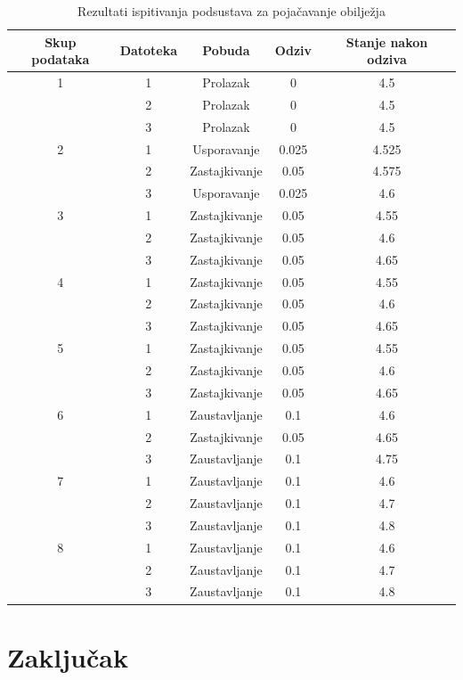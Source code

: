 \documentclass[times, utf8, diplomski, numeric]{fer}
\begin{document}
\begin{table}[H]
	\caption{Rezultati ispitivanja podsustava za pojačavanje obilježja}
	\label{tbl:rezultati}
	\centering
	\begin{tabular}{|c|c|c|c|c|} \hline		
		Skup podataka & Datoteka & Pobuda & Odziv & Stanje nakon odziva\\ \hline
		1 & 1 & Prolazak & 0 & 4.5\\
		 & 2 & Prolazak & 0 & 4.5\\
		 & 3 & Prolazak & 0 & 4.5\\ \hline
		2 & 1 & Usporavanje & 0.025 & 4.525\\
		 & 2 & Zastajkivanje & 0.05 & 4.575\\
		 & 3 & Usporavanje & 0.025 & 4.6\\ \hline
		3 & 1 & Zastajkivanje & 0.05 & 4.55\\
		 & 2 & Zastajkivanje & 0.05 & 4.6\\
		 & 3 & Zastajkivanje & 0.05 & 4.65\\ \hline
		 
		 4 & 1 & Zastajkivanje & 0.05 & 4.55\\
		 & 2 & Zastajkivanje & 0.05 & 4.6\\
		 & 3 & Zastajkivanje & 0.05 & 4.65\\ \hline
		5 & 1 & Zastajkivanje & 0.05 & 4.55\\
		 & 2 & Zastajkivanje & 0.05 & 4.6\\
		 & 3 & Zastajkivanje & 0.05 & 4.65\\ \hline
		6 & 1 & Zaustavljanje & 0.1 & 4.6\\
		 & 2 & Zastajkivanje & 0.05 & 4.65\\
		 & 3 & Zaustavljanje & 0.1 & 4.75\\ \hline
		 
		 7 & 1 & Zaustavljanje & 0.1 & 4.6\\
		 & 2 & Zaustavljanje & 0.1 & 4.7\\
		 & 3 & Zaustavljanje & 0.1 & 4.8\\ \hline
		8 & 1 & Zaustavljanje & 0.1 & 4.6\\
		 & 2 & Zaustavljanje & 0.1 & 4.7\\
		 & 3 & Zaustavljanje & 0.1 & 4.8\\ \hline

	\end{tabular}
\end{table}

\chapter{Zaključak}
\end{document}
